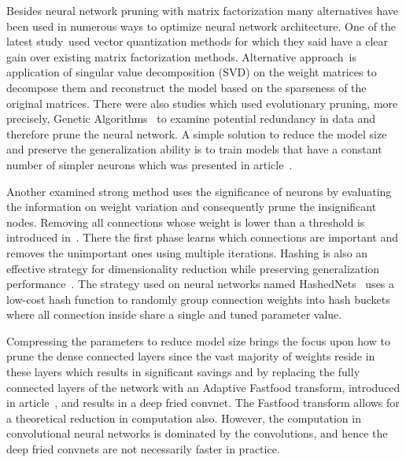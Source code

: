 \documentclass{article} %
\begin{document}
Besides neural network pruning with matrix factorization many alternatives have 
been used in numerous ways to optimize neural network architecture. One of the 
latest study~\cite{DBLP:journals/corr/GongLYB14}used vector quantization methods 
for which they said have a clear gain over existing matrix factorization 
methods. Alternative approach~\cite{xue2013restructuring}is application of 
singular value decomposition (SVD) on the weight matrices to decompose them and 
reconstruct the model based on the sparseness of the original matrices. There 
were also studies which used evolutionary pruning, more precisely, Genetic 
Algorithms~\cite{li2012tuning} to examine potential redundancy in data and 
therefore prune the neural network. A simple solution to reduce the model size 
and preserve the generalization ability is to train models that have a constant 
number of simpler neurons which was presented in 
article~\cite{collins2014memory}.

Another examined strong method uses the significance of neurons by evaluating 
the information on weight variation and consequently prune the insignificant 
nodes. 
Removing all connections whose weight is lower than a threshold is introduced 
in~\cite{han2015learning}. There the first phase learns which connections are 
important and removes the unimportant ones using multiple iterations. Hashing is 
also an effective strategy for dimensionality reduction while preserving 
generalization performance~\cite{weinberger2009feature, shi2009hash}. The 
strategy used on neural networks named HashedNets~\cite{chen2015compressing} 
uses a low-cost hash function to randomly group connection weights into hash 
buckets where all connection inside share a single and tuned parameter value. 

Compressing the parameters to reduce model size brings the focus upon how to 
prune the dense connected layers since the vast majority of weights reside in 
these layers which results in significant savings and by replacing the fully 
connected layers of the network with an Adaptive Fastfood transform, introduced 
in article~\cite{yang2014deep}, and results 
in a deep fried convnet. The Fastfood transform allows for a theoretical 
reduction in computation also. However, the computation in convolutional neural 
networks is dominated by the convolutions, and hence the deep fried convnets are 
not necessarily faster in practice. 
\end{document}
